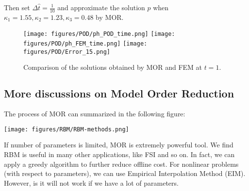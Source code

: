Then set $\Delta \hat t=\frac{1}{10}$ and approximate the solution $p$ when $\kappa_1=1.55,\kappa_2=1.23,\kappa_3=0.48$ by MOR.

\begin{center}

\begin{figure}[!htbp]
	\texttt{[image: figures/POD/ph\_POD\_time.png]}
	\texttt{[image: figures/POD/ph\_FEM\_time.png]}
	\texttt{[image: figures/POD/Error\_15.png]}
	\caption{Comparison of the solutions obtained by MOR and FEM at $t=1$.}
\end{figure}

\end{center}

\subsection{More discussions on Model Order Reduction}
The process of MOR can summarized in the following figure: 
 \begin{center}
     \texttt{[image: figures/RBM/RBM-methods.png]}
 \end{center}
\begin{remark} 
If number of parameters is limited, MOR is extremely powerful tool.  We find RBM is useful in many other applications, like FSI  and so on. In fact,  we can apply a greedy algorithm to further reduce offline cost.  For nonlinear problems (with respect to parameters), we can use Empirical Interpolation Method (EIM). However, is it will not work if we have a lot of parameters. 
\end{remark}









































